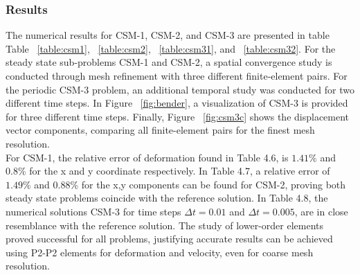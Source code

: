 \newpage

\subsubsection*{Results}
The numerical results for CSM-1, CSM-2, and CSM-3 are presented in table Table ~\ref{table:csm1}, ~\ref{table:csm2}, ~\ref{table:csm31}, and ~\ref{table:csm32}. For the steady state sub-problems CSM-1 and CSM-2, a spatial convergence study is conducted through mesh refinement with three different finite-element pairs. For the periodic CSM-3 problem, an additional temporal study was conducted for two different time steps. In Figure ~\ref{fig:bender}, a visualization of CSM-3 is provided for three different time steps. Finally, Figure ~\ref{fig:csm3c} shows the displacement vector components, comparing all finite-element pairs for the finest mesh resolution. \\

 For CSM-1, the relative error of deformation found in Table 4.6, is $1.41 \%$ and $0.8\%$ for the x and y coordinate respectively. In Table 4.7, a relative error of   $1.49 \%$ and $0.88\%$ for the x,y components can be found for CSM-2, proving both steady state problems coincide with the reference solution. In Table 4.8, the numerical solutions CSM-3 for time steps $\Delta t = 0.01$ and $\Delta t = 0.005$, are in close resemblance with the reference solution. The study of lower-order elements proved successful for all problems, justifying accurate results can be achieved using P2-P2 elements for deformation and velocity, even for coarse mesh resolution. 

